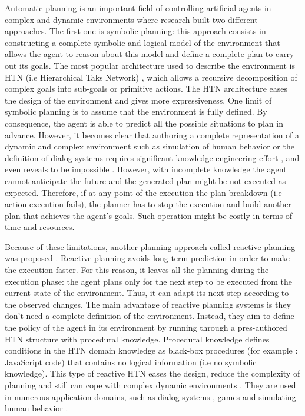 \documentclass[conference]{IEEEtran}
\begin{document}
	\par Automatic planning is an important field of controlling artificial agents in complex and dynamic environments where research built two different approaches. The first one is symbolic planning: this approach consists in constructing a complete symbolic and logical model of the environment that allows the agent to reason about this model and define a complete plan to carry out its goals.  
	The most popular architecture used to describe the environment is  HTN (i.e Hierarchical Taks Network) \cite{erol1996hierarchical}, which allows a recursive decomposition of complex goals into sub-goals or primitive actions. The HTN architecture eases the design of the environment and gives more expressiveness. One limit of symbolic planning is to  assume that the environment is fully defined. By consequence,  the agent is able to predict all the possible situations to plan in advance. However, it becomes clear that authoring a complete representation of a dynamic and complex environment such as simulation of human behavior \cite{conte1998mas} or the definition of dialog systems \cite{allen2002human} requires significant  knowledge-engineering effort \cite{zhuo2009learning}, and even reveals to be impossible \cite{maes1990designing}. However, with incomplete knowledge the agent cannot anticipate the future and the generated plan might be not executed as expected. Therefore, if at any point of the execution the plan breakdown (i.e action execution fails), the planner has to stop the execution and build another plan that achieves the agent's goals. Such operation might be costly in terms of time and resources. 
	
	\par Because of these limitations, another planning approach called reactive planning was proposed \cite{firby1987investigation}. Reactive planning avoids long-term prediction in order to make the execution faster. For this reason, it leaves all the planning during the execution phase: the agent plans only for the next step to be executed from the current  state of the environment. Thus, it can adapt its next step according to the observed changes. The main advantage of reactive planning systems is they don't need a complete definition of the environment. Instead, they aim to define the policy of the agent in its environment by running through a pres-authored HTN structure with  procedural  knowledge. Procedural knowledge defines conditions in the HTN domain knowledge as black-box procedures (for example : JavaScript code) that contains no logical information (i.e no symbolic knowledge). This type of reactive HTN  eases the design, reduce the complexity of planning and still can cope with complex dynamic environments \cite {brom2005hierarchical}. They are used in numerous application domains, such as dialog systems \cite{bohus2003ravenclaw}, games \cite{isla2005handling} and simulating human behavior \cite{brom2005hierarchical}.
	
\end{document}

